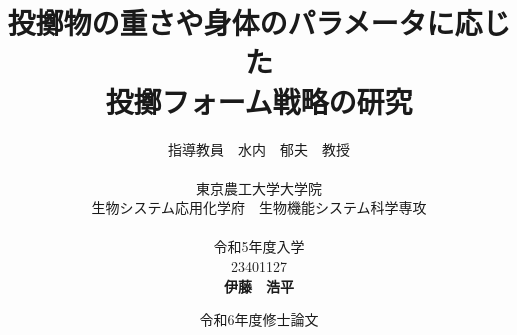 


\usepackage{ikuo}%

\usepackage[dvipdfmx]{hyperref}  %
\usepackage{pxjahyper} %
\hypersetup{colorlinks=true}
\hypersetup{linkcolor=black}
\hypersetup{urlcolor=black}
\hypersetup{citecolor=black}

\usepackage{url} %


\newcommand{\FIGDIR}{./fig}        %
\usepackage{otf}

\date{令和6年度修士論文}
\title{投擲物の重さや身体のパラメータに応じた\\投擲フォーム戦略の研究}
\author{指導教員　水内　郁夫　教授 \\
\ \\
東京農工大学大学院　\\
生物システム応用化学府　生物機能システム科学専攻　\\
\ \\
令和5年度入学\\
23401127\\
{\bf 伊藤　浩平}}


\setlength{\baselineskip}{20pt}
\maketitle
\tableofcontents







% 

% 





